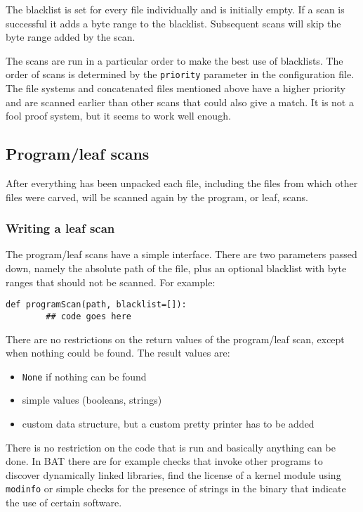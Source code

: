 \documentclass[10pt]{article}
\begin{document}
The blacklist is set for every file individually and is initially empty. If a
scan is successful it adds a byte range to the blacklist. Subsequent scans
will skip the byte range added by the scan.

The scans are run in a particular order to make the best use of blacklists. The
order of scans is determined by the \texttt{priority} parameter in the
configuration file. The file systems and concatenated files mentioned above
have a higher priority and are scanned earlier than other scans that could also
give a match. It is not a fool proof system, but it seems to work well enough.

\subsection{Program/leaf scans}

After everything has been unpacked each file, including the files from which
other files were carved, will be scanned again by the program, or leaf, scans.

\subsubsection{Writing a leaf scan}

The program/leaf scans have a simple interface. There are two parameters
passed down, namely the absolute path of the file, plus an optional blacklist
with byte ranges that should not be scanned. For example:

\begin{verbatim}
def programScan(path, blacklist=[]):
        ## code goes here
\end{verbatim}

There are no restrictions on the return values of the program/leaf scan, except
when nothing could be found. The result values are:

\begin{itemize}
\item \texttt{None} if nothing can be found
\item simple values (booleans, strings)
\item custom data structure, but a custom pretty printer has to be added
\end{itemize}

There is no restriction on the code that is run and basically anything can be
done. In BAT there are for example checks that invoke other programs to discover
dynamically linked libraries, find the license of a kernel module using
\texttt{modinfo} or simple checks for the presence of strings in the binary
that indicate the use of certain software.
\end{document}
